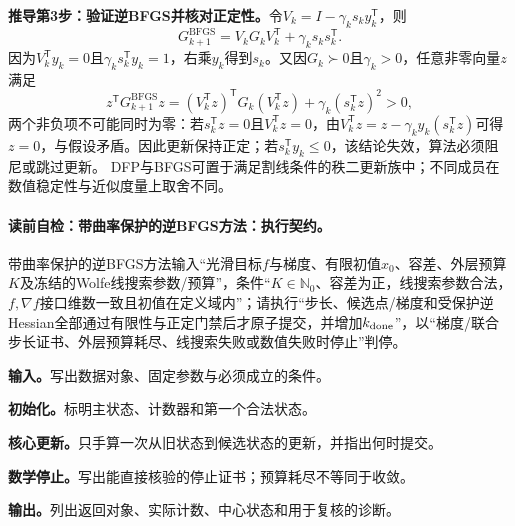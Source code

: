 \textbf{推导第3步：验证逆BFGS并核对正定性。}令$V_k=I-\gamma_ks_ky_k^{\mathsf T}$，则
\[
G_{k+1}^{\mathrm{BFGS}}=V_kG_kV_k^{\mathsf T}+\gamma_ks_ks_k^{\mathsf T}.
\]
因为$V_k^{\mathsf T}y_k=0$且$\gamma_ks_k^{\mathsf T}y_k=1$，右乘$y_k$得到$s_k$。又因$G_k\succ0$且$\gamma_k>0$，任意非零向量$z$满足
\[
z^{\mathsf T}G_{k+1}^{\mathrm{BFGS}}z
=(V_k^{\mathsf T}z)^{\mathsf T}G_k(V_k^{\mathsf T}z)
+\gamma_k(s_k^{\mathsf T}z)^2>0,
\]
两个非负项不可能同时为零：若$s_k^{\mathsf T}z=0$且$V_k^{\mathsf T}z=0$，由$V_k^{\mathsf T}z=z-\gamma_ky_k(s_k^{\mathsf T}z)$可得$z=0$，与假设矛盾。因此更新保持正定；若$s_k^{\mathsf T}y_k\le0$，该结论失效，算法必须阻尼或跳过更新。
DFP与BFGS可置于满足割线条件的秩二更新族中；不同成员在数值稳定性与近似度量上取舍不同。

\paragraph{读前自检：带曲率保护的逆BFGS方法：执行契约。}带曲率保护的逆BFGS方法输入“光滑目标$f$与梯度、有限初值$x_0$、容差、外层预算$K$及冻结的Wolfe线搜索参数/预算”，条件“$K\in\mathbb N_0$、容差为正，线搜索参数合法，$f,\nabla f$接口维数一致且初值在定义域内”；请执行“步长、候选点/梯度和受保护逆Hessian全部通过有限性与正定门禁后才原子提交，并增加$k_{\rm done}$”，以“梯度/联合步长证书、外层预算耗尽、线搜索失败或数值失败时停止”判停。\par
\begin{keypointbox}[title={带曲率保护的逆BFGS方法：五步阅读}]
\textbf{输入。}写出数据对象、固定参数与必须成立的条件。\par
\textbf{初始化。}标明主状态、计数器和第一个合法状态。\par
\textbf{核心更新。}只手算一次从旧状态到候选状态的更新，并指出何时提交。\par
\textbf{数学停止。}写出能直接核验的停止证书；预算耗尽不等同于收敛。\par
\textbf{输出。}列出返回对象、实际计数、中心状态和用于复核的诊断。
\end{keypointbox}

